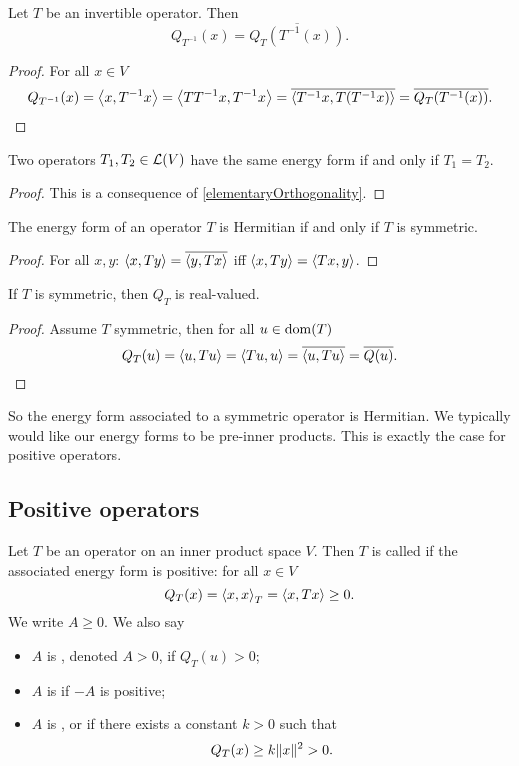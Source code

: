 \begin{lemma} \label{quadraticFormInverseOperator}
Let $T$ be an invertible operator. Then
\[ Q_{T^{-1}}(x) = \overline{Q_T(T^{-1}(x))}. \]
\end{lemma}
\begin{proof}
For all $x\in V$
\[ Q_{T^{-1}}(x) = \left\langle x,T^{-1}x \right\rangle = \left\langle TT^{-1}x, T^{-1}x \right\rangle = \overline{\left\langle T^{-1}x, T(T^{-1}x) \right\rangle} = \overline{Q_T(T^{-1}(x))}. \]
\end{proof}

\begin{lemma} \label{sameEnergyFormSameOperator}
Two operators $T_1,T_2\in \operatorname{\mathcal{L}}(V)$ have the same energy form \textup{if and only if} $T_1 = T_2$.
\end{lemma}
\begin{proof}
This is a consequence of \ref{elementaryOrthogonality}.
\end{proof}

\begin{lemma} \label{energyFormHermitianSymmetric}
The energy form of an operator $T$ is Hermitian \textup{if and only if} $T$ is symmetric.
\end{lemma}
\begin{proof}
For all $x,y$: $\left\langle x,Ty \right\rangle = \overline{\left\langle y, Tx \right\rangle}$ iff $\left\langle x,Ty \right\rangle = \left\langle Tx, y \right\rangle$.
\end{proof}
\begin{corollary} \label{symmetricRealQuadraticForm}
If $T$ is symmetric, then $Q_T$ is real-valued.
\end{corollary}
\begin{proof}
Assume $T$ symmetric, then for all $u\in\operatorname{dom}(T)$
\[ Q_T(u) = \left\langle u,Tu \right\rangle = \left\langle Tu,u \right\rangle = \overline{\left\langle u,Tu \right\rangle} = \overline{Q(u)}. \]
\end{proof}

So the energy form associated to a symmetric operator is Hermitian. We typically would like our energy forms to be pre-inner products. This is exactly the case for positive operators.

\subsection{Positive operators}
\begin{definition}
Let $T$ be an operator on an inner product space $V$. Then $T$ is called  if the associated energy form is positive: for all $x\in V$
\[ Q_T(x) = \left\langle x,x \right\rangle_T = \left\langle x,Tx \right\rangle \geq 0. \]
We write $A \geq 0$. We also say
\begin{itemize}
\item $A$ is , denoted $A > 0$, if $Q_T(u) > 0$;
\item $A$ is  if $-A$ is positive;
\item $A$ is ,  or  if there exists a constant $k>0$ such that
\[ Q_T(x) \geq k\lVert x\rVert^2 > 0. \]
\end{itemize}
\end{definition}

